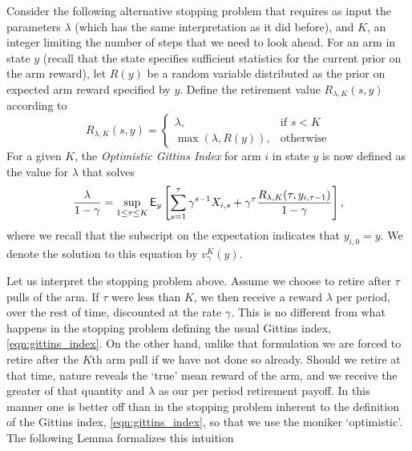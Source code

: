 Consider the following alternative stopping problem that requires as input the parameters $\lambda$ (which has the same interpretation as it did before), and $K$, an integer limiting the number of steps that we need to look ahead. For an arm in state $y$ (recall that the state specifies sufficient statistics for the current prior on the arm reward), let $R(y)$ be a random variable distributed as the prior on expected arm reward specified by $y$. Define the retirement value $R_{\lambda,K}(s,y)$ according to 
\[
R_{\lambda,K}(s, y) = 
\begin{cases}
\lambda ,& \text{if } s < K\\
\max\left(\lambda, R(y) \right), & \text{otherwise}
\end{cases}
\]
For a given $K$, the \emph{Optimistic Gittins Index} for arm $i$ in state $y$ is now defined as the value for $\lambda$ that solves
\begin{equation} \label{eqn:ogi_general}
\frac{ \lambda}{1-\gamma} = \sup_{1 \le \tau \leq K}
\mathsf{E}_y\left[
	\sum_{s=1}^{\tau} \gamma^{s-1}X_{i,s} + \gamma^{\tau} \frac{R_{\lambda,K}(\tau, y_{i,\tau-1})}{1-\gamma}
\right],
\end{equation}
where we recall that the subscript on the expectation indicates that $y_{i,0} = y$. 
We denote the solution to this equation by $v_\gamma^{K}(y)$.

Let us interpret the stopping problem above. Assume we choose to retire after $\tau$ pulls of the arm. If $\tau$ were less than $K$, we then receive a reward $\lambda$ per period, over the rest of time, discounted at the rate $\gamma$. This is no different from what happens in the stopping problem defining the usual Gittins index, \eqref{eqn:gittins_index}. On the other hand, unlike that formulation we are forced to retire after the $K$th arm pull if we have not done so already. Should we retire at that time, nature reveals the `true' mean reward of the arm, and we receive the greater of that quantity and $\lambda$ as our per period retirement payoff. In this manner one is better off than in the stopping problem inherent to the definition of the Gittins index, \eqref{eqn:gittins_index}, so that we use the moniker `optimistic'.
The following Lemma formalizes this intuition

